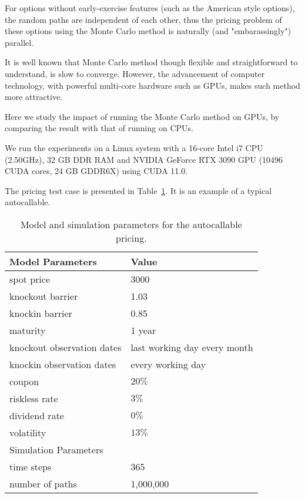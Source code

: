 For options without early-exercise features (such as the
American style options), the random paths are independent of each other, thus
the pricing problem of these options using the Monte Carlo method is naturally
(and "embarassingly") parallel.

It is well known that Monte Carlo method though flexible and straightforward to
understand, is slow to converge. However, the advancement of computer
technology, with powerful multi-core hardware such as GPUs, makes such method
more attractive.

Here we study the impact of running the Monte Carlo method on GPUs, by
comparing the result with that of running on CPUs.

We run the experiments on a Linux system with a 16-core Intel i7 CPU (2.50GHz),
32 GB DDR RAM and NVIDIA GeForce RTX 3090 GPU (10496 CUDA cores, 24 GB GDDR6X) using
CUDA 11.0.

The pricing test case is presented in Table~\ref{T:param}. It is an example of a
typical autocallable.

\begin{table}
\caption{Model and simulation parameters for the autocallable pricing.}
\begin{tabular}{l l}
\hline\hline
Model Parameters & Value \\
\hline
spot price  & 3000  \\ 
knockout barrier  & 1.03  \\
knockin barrier   & 0.85  \\
maturity          & 1 year \\
knockout observation dates & last working day every month \\
knockin observation dates  & every working day  \\
coupon  &  $20\%$  \\
riskless rate &  $3\%$  \\
dividend rate &  $0\%$  \\
volatility    &  $13\%$ \\
\hline
Simulation Parameters &    \\
\hline
time steps  &   365  \\
number of paths &   1,000,000 \\
\hline
\end{tabular}
\label{T:param}
\end{table}

\medskip


